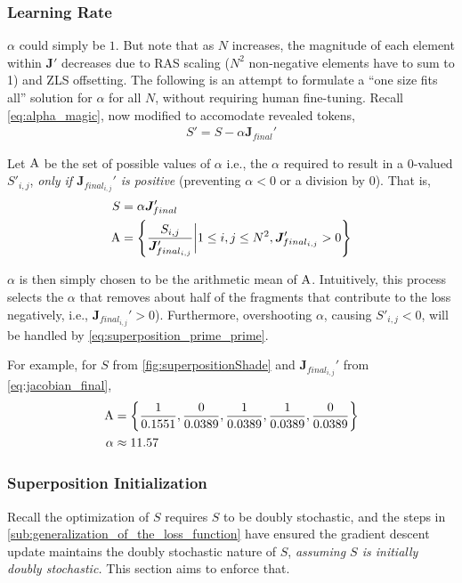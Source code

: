 \subsubsection{Learning Rate}%
\label{ssub:learning_rate}
$\alpha$ could simply be $1$. But note that as $N$ increases, the magnitude of each element within $\bm{J}'$ decreases due to RAS scaling ($N^2$ non-negative elements have to sum to 1) and ZLS offsetting. The following is an attempt to formulate a ``one size fits all'' solution for $\alpha$ for all $N$, without requiring human fine-tuning.
Recall \autoref{eq:alpha_magic}, now modified to accomodate revealed tokens,
\begin{align}
    S'=S-\alpha \bm{J}_{final}'
    \label{eq:alpha_magic_revealed}
\end{align}

Let $\mathrm{A}$ be the set of possible values of $\alpha$ i.e., the $\alpha$ required to result in a 0-valued $S'_{i,j}$, \emph{only if $\bm{J}_{final_{i,j}}'$ is positive} (preventing $\alpha<0$ or a division by 0). That is,
\begin{align}
    S&=\alpha \bm{J}_{final}'\nonumber\\
    \mathrm{A}&=\left\{\frac{S_{i,j}}{\bm{J}_{final_{i,j}}'}\bigg\rvert 1\leq i,j\leq N^2,\bm{J}_{final_{i,j}}'>0\right\}
\end{align}

$\alpha$ is then simply chosen to be the arithmetic mean of $\mathrm{A}$. Intuitively, this process selects the $\alpha$ that removes about half of the fragments that contribute to the loss negatively, i.e., $\bm{J}_{final_{i,j}}'>0$). Furthermore, overshooting $\alpha$, causing $S'_{i,j}<0$, will be handled by \autoref{eq:superposition_prime_prime}.

For example, for $S$ from \autoref{fig:superpositionShade} and
$\bm{J}_{final_{i,j}}'$ from \autoref{eq:jacobian_final},
\begin{align}
    \mathrm{A}&=\left\{
          \frac{1}{0.1551},\frac{0}{0.0389},\frac{1}{0.0389},\frac{1}{0.0389},\frac{0}{0.0389}
          \right\}\nonumber\\
          \alpha&\approx 11.57
          \label{eq:alpha_matrix}
\end{align}

\subsubsection{Superposition Initialization}%
\label{ssub:superposition_initialization}
Recall the optimization of $S$ requires $S$ to be doubly stochastic, and the steps in \autoref{sub:generalization_of_the_loss_function} have ensured the gradient descent update maintains the doubly stochastic nature of $S$, \emph{assuming $S$ is initially doubly stochastic.} This section aims to enforce that.

